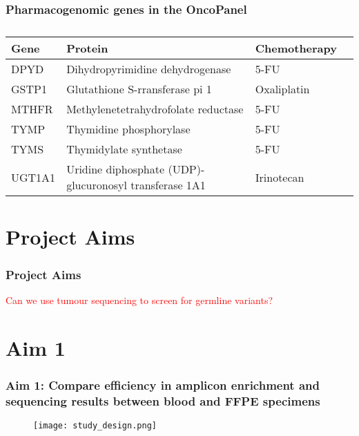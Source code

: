 \documentclass{beamer}
\begin{document}
\begin{frame}
\frametitle{Pharmacogenomic genes in the OncoPanel}
\scriptsize
\begin{table}
    \caption{}
    \centering
    \begin{tabular}{llll}
    \hline
    Gene & Protein & Chemotherapy \\
    \hline
    DPYD & Dihydropyrimidine dehydrogenase & 5-FU \\
    GSTP1 & Glutathione S-rransferase pi 1 & Oxaliplatin \\
    MTHFR & Methylenetetrahydrofolate reductase & 5-FU \\
    TYMP & Thymidine phosphorylase & 5-FU \\
    TYMS & Thymidylate synthetase & 5-FU \\
    UGT1A1 & Uridine diphosphate (UDP)-glucuronosyl transferase 1A1 & Irinotecan \\
    \hline
    \end{tabular}
\end{table}
\end{frame}

\section{Project Aims}

\begin{frame}
\frametitle{Project Aims}
\textcolor{red}{Can we use tumour sequencing to screen for germline variants?}
\begin{enumerate}
\end{enumerate}
\end{frame}

\section{Aim 1}
\begin{frame}
\frametitle{Aim 1: Compare efficiency in amplicon enrichment and sequencing results between blood and FFPE specimens}
\begin{figure}[t]
    \texttt{[image: study\_design.png]}
\end{figure}
\end{frame}
\end{document}
